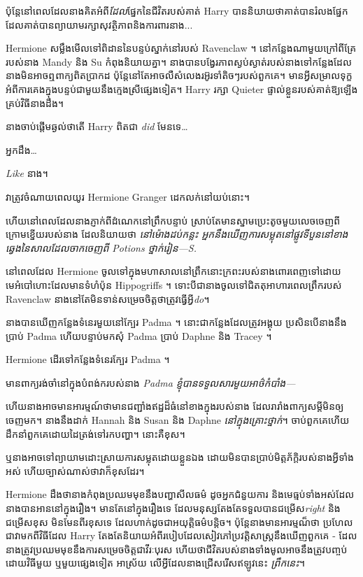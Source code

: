 {{{ប៉ុន្តែនៅពេលដែលនាងគិតអំពី\emph{ដែល}ផ្នែកនៃជីវិតរបស់គាត់ Harry បាននិយាយថាគាត់បានរំលងផ្នែកដែលគាត់បានព្យាយាមរក្សាសុវត្ថិភាពនិងការពារនាង...

Hermione សម្លឹងមើលទៅពិដាននៃបន្ទប់ស្នាក់នៅរបស់ Ravenclaw ។ នៅកន្លែងណាមួយក្រៅពីគ្រែរបស់នាង Mandy និង Su កំពុងនិយាយគ្នា។ នាងបានបង្វែរភាពស្ងប់ស្ងាត់របស់នាងទៅកន្លែងដែលនាងមិនអាចឮពាក្យពិតប្រាកដ ប៉ុន្តែនៅតែអាចលឺសំលេងរអ៊ូរទាំតិចៗរបស់ពួកគេ។ មាន​អ្វី​សម្រាល​ទុក្ខ​អំពី​ការ​គេង​ក្នុង​បន្ទប់​ជាមួយ​នឹង​ក្មេង​ស្រី​ផ្សេង​ទៀត។ Harry រក្សា Quieter ផ្ទាល់ខ្លួនរបស់គាត់ឱ្យឡើងគ្រប់វិធីនាងដឹង។

នាង​ចាប់​ផ្ដើម​ឆ្ងល់​ថា​តើ Harry ពិត​ជា \emph{did} មែន​ទេ…

អ្នកដឹង…

\emph{Like} នាង។

វាត្រូវចំណាយពេលយូរ Hermione Granger ដេកលក់នៅយប់នោះ។

ហើយនៅពេលដែលនាងភ្ញាក់ពីដំណេកនៅព្រឹកបន្ទាប់ ស្រាប់តែមានស្នាមប្រេះតូចមួយលេចចេញពីក្រោមខ្នើយរបស់នាង ដែលនិយាយថា \emph{នៅម៉ោងដប់កន្លះ អ្នកនឹងឃើញការសម្លុតនៅផ្លូវទីបួននៅខាងឆ្វេងនៃសាលដែលចាកចេញពី Potions ថ្នាក់រៀន—S.}

\later

នៅពេលដែល Hermione ចូលទៅក្នុងមហាសាលនៅព្រឹកនោះក្រពះរបស់នាងពោរពេញទៅដោយមេអំបៅហោះដែលមានទំហំប៉ុន Hippogriffs ។ ទោះបីជានាងចូលទៅជិតតុអាហារពេលព្រឹករបស់ Ravenclaw នាងនៅតែមិនទាន់សម្រេចចិត្តថាត្រូវធ្វើអ្វី\emph{do}។

នាងបានឃើញកន្លែងទំនេរមួយនៅក្បែរ Padma ។ នោះជាកន្លែងដែលត្រូវអង្គុយ ប្រសិនបើនាងនឹងប្រាប់ Padma ហើយបន្ទាប់មកសុំ Padma ប្រាប់ Daphne និង Tracey ។

Hermione ដើរទៅកន្លែងទំនេរក្បែរ Padma ។

មានពាក្យរង់ចាំនៅក្នុងបំពង់ករបស់នាង \emph{Padma ខ្ញុំបានទទួលសារមួយ\emph{អាថ៌កំបាំង}—}

ហើយនាងអាចមានអារម្មណ៍ថាមានជញ្ជាំងឥដ្ឋដ៏ធំនៅខាងក្នុងរបស់នាង ដែលរារាំងពាក្យសម្ដីមិនឲ្យចេញមក។ នាងនឹងដាក់ Hannah និង Susan និង Daphne \emph{នៅក្នុងគ្រោះថ្នាក់}។ ចាប់ពួកគេហើយដឹកនាំពួកគេដោយដៃត្រង់ទៅរកបញ្ហា។ នោះគឺខុស។

ឬនាងអាចទៅព្យាយាមដោះស្រាយការសម្លុតដោយខ្លួនឯង ដោយមិនបានប្រាប់មិត្តភ័ក្តិរបស់នាងអ្វីទាំងអស់ ហើយច្បាស់ណាស់ថាវាក៏ខុសដែរ។

Hermione ដឹងថានាងកំពុងប្រឈមមុខនឹងបញ្ហាសីលធម៌ ដូចអ្នកជំនួយការ និងមេធ្មប់ទាំងអស់ដែលនាងបានអាននៅក្នុងរឿង។ មានតែនៅក្នុងរឿងទេ ដែលមនុស្សតែងតែទទួលបានជម្រើស\emph{right} និងជម្រើសខុស មិនមែនពីរខុសទេ ដែលហាក់ដូចជាអយុត្តិធម៌បន្តិច។ ប៉ុន្តែនាងមានអារម្មណ៏ថា ប្រហែលជាវាមកពីវិធីដែល Harry តែងតែនិយាយអំពីរបៀបដែលសៀវភៅប្រវត្តិសាស្ត្រនឹងឃើញពួកគេ - ដែលនាងត្រូវប្រឈមមុខនឹងការសម្រេចចិត្តជាវីរៈបុរស ហើយថាជីវិតរបស់នាងទាំងមូលអាចនឹងត្រូវបញ្ចប់ដោយវិធីមួយ ឬមួយផ្សេងទៀត អាស្រ័យ លើអ្វីដែលនាងជ្រើសរើសឥឡូវនេះ \emph{ព្រឹកនេះ}។

}}}
